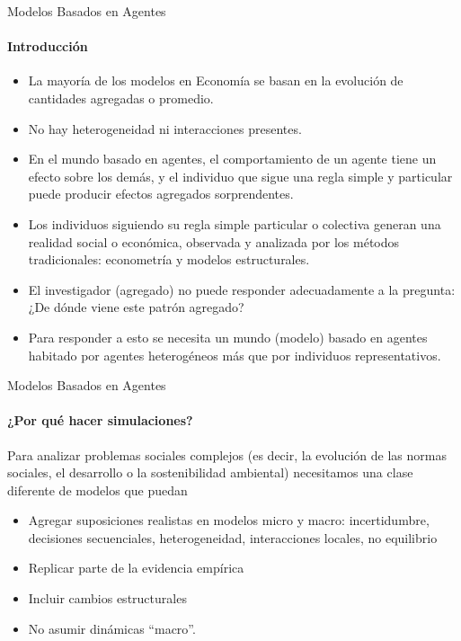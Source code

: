\documentclass[11pt]{beamer}
\begin{document}
\begin{frame}
\begin{frame}{Modelos Basados en Agentes}
\framesubtitle{Introducción}
 \begin{itemize}
 \small    \item La mayoría de los modelos en Economía se basan en la evolución de cantidades agregadas o promedio.
      \item No hay heterogeneidad ni interacciones presentes.
      \item En el mundo basado en agentes, el comportamiento de un agente tiene un efecto sobre los demás, y el individuo que sigue una regla simple y particular puede producir efectos agregados sorprendentes.
\item Los individuos siguiendo su regla simple particular o colectiva generan una realidad social o económica, observada y analizada por los métodos tradicionales: econometría y modelos estructurales.
\item El investigador (agregado) no puede responder adecuadamente a la pregunta: ¿De dónde viene este patrón agregado?
\item Para responder a esto se necesita un  mundo (modelo) basado en agentes habitado por agentes heterogéneos más que por individuos representativos.
 \end{itemize}
\end{frame}

\begin{frame}{Modelos Basados en Agentes}
\framesubtitle{¿Por qué hacer simulaciones?}
Para analizar problemas sociales complejos (es decir, la evolución de las normas sociales, el desarrollo o la sostenibilidad ambiental) necesitamos una clase diferente de modelos que puedan
  \begin{itemize}
      \item Agregar suposiciones realistas en modelos micro y macro:
incertidumbre, decisiones secuenciales, heterogeneidad, interacciones locales, no equilibrio
\item Replicar parte de la evidencia empírica
\item Incluir cambios estructurales
\item No asumir dinámicas ``macro''.
 \end{itemize}
\end{frame}


\end{frame}
\end{document}
